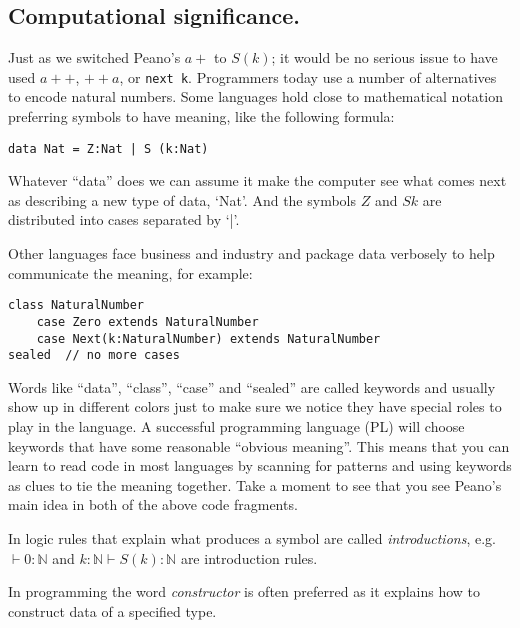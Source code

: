 \subsection{Computational significance.}
Just as we switched Peano's $a+$ to $S(k)$;
it would be no serious issue to have used $a++$, $++a$, or \lstinline{next k}.
Programmers today use a number of alternatives to encode natural 
numbers.  Some languages hold close to mathematical notation 
preferring symbols to have meaning, like the following formula:
\begin{center}
\begin{lstlisting}[language=Hidris]
    data Nat = Z:Nat | S (k:Nat)
\end{lstlisting}
\end{center}
Whatever ``data'' does we can assume it make the computer see what comes 
next as describing a new type of data, `Nat'.  And the symbols 
$Z$ and $S k$ are distributed into cases separated by `|'.

Other languages face business and industry and package data 
verbosely to help communicate the meaning, for example:
\begin{center}
\begin{lstlisting}[language=Sava]
class NaturalNumber
    case Zero extends NaturalNumber
    case Next(k:NaturalNumber) extends NaturalNumber
sealed  // no more cases
\end{lstlisting}
\end{center}
Words like ``data'', ``class'', ``case'' and ``sealed'' are 
called keywords and usually show up in different colors just to make 
sure we notice they have special roles to play in the language.
A successful programming language (PL) will choose keywords 
that have some reasonable ``obvious meaning''.  This means that you 
can learn to read code in most languages by scanning for patterns 
and using keywords as clues to tie the meaning together.  Take 
a moment to see that you see Peano's main idea in both of the above 
code fragments.

\begin{definition}
    In logic rules that explain what produces a symbol are called 
    \emph{introductions}, e.g.\ $\vdash 0:\mathbb{N}$ and 
    $k:\mathbb{N}\vdash S(k):\mathbb{N}$ are introduction rules.
    
    In programming the word \emph{constructor} is often preferred
    as it explains how to construct data of a specified type.        
\end{definition}

